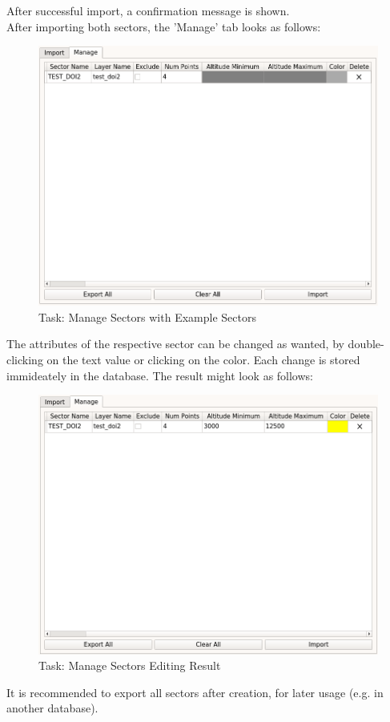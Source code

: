 After successful import, a confirmation message is shown. \\

After importing both sectors, the 'Manage' tab looks as follows:

\begin{figure}[H]
    \includegraphics[width=16cm,frame]{../screenshots/manage_sectors_manage2.png}
  \caption{Task: Manage Sectors with Example Sectors}
\end{figure}

The attributes of the respective sector can be changed as wanted, by double-clicking on the text value or clicking on the color. Each change is stored immideately in the database. The result might look as follows:\\

\begin{figure}[H]
    \includegraphics[width=16cm,frame]{../screenshots/manage_sectors_done.png}
  \caption{Task: Manage Sectors Editing Result}
\end{figure}

It is recommended to export all sectors after creation, for later usage (e.g. in another database).

